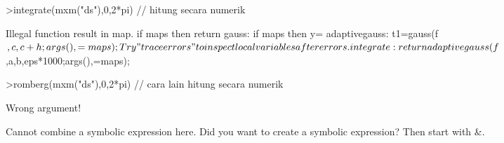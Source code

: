 \documentclass[12pt,Times new roman,letterpaper]{book}
\begin{document}
\begin{eulernootebook}
\begin{eulercomment}
\begin{eulercomment}
\begin{eulernootebook}
\begin{eulercomment}
\begin{eulercomment}
\begin{eulercomment}
\begin{eulercomment}
\begin{eulercomment}
\begin{eulercomment}
\begin{eulernotebook}
\begin{eulercomment}
\begin{eulercomment}
\begin{eulercomment}
\begin{eulercomment}
\begin{eulercomment}
\begin{eulercomment}
\begin{eulercomment}
\begin{eulercomment}
\begin{eulercomment}
\begin{eulercomment}
\begin{eulercomment}
\begin{eulercomment}
\begin{eulercomment}
\begin{eulercomment}
\begin{eulercomment}
\begin{eulercomment}
\begin{eulerprompt}
>integrate(mxm("ds"),0,2*pi) // hitung secara numerik
\end{eulerprompt}
\begin{euleroutput}
  Illegal function result in map.
      if maps then return %
  gauss:
      if maps then y=%
  adaptivegauss:
      t1=gauss(f$,c,c+h;args(),=maps);
  Try "trace errors" to inspect local variables after errors.
  integrate:
      return adaptivegauss(f$,a,b,eps*1000;args(),=maps);
\end{euleroutput}
\begin{eulerprompt}
>romberg(mxm("ds"),0,2*pi) // cara lain hitung secara numerik
\end{eulerprompt}
\begin{euleroutput}
  Wrong argument!
  
  Cannot combine a symbolic expression here.
  Did you want to create a symbolic expression?
  Then start with &.
  

\end{euleroutput}
\end{eulercomment}
\end{eulercomment}
\end{eulercomment}
\end{eulercomment}
\end{eulercomment}
\end{eulercomment}
\end{eulercomment}
\end{eulercomment}
\end{eulercomment}
\end{eulercomment}
\end{eulercomment}
\end{eulercomment}
\end{eulercomment}
\end{eulercomment}
\end{eulercomment}
\end{eulercomment}
\end{eulernotebook}
\end{eulercomment}
\end{eulercomment}
\end{eulercomment}
\end{eulercomment}
\end{eulercomment}
\end{eulercomment}
\end{eulernootebook}
\end{eulercomment}
\end{eulercomment}
\end{eulernootebook}
\end{document}
